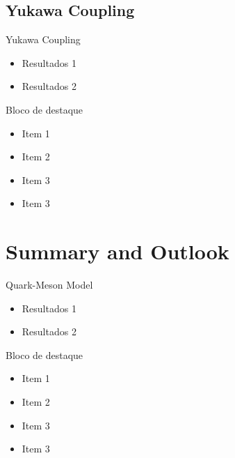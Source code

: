 \documentclass{if-beamer}
\begin{document}
\subsection{Yukawa Coupling}
\begin{frame}{Yukawa Coupling}

\begin{itemize}
    \item Resultados 1
    \item Resultados 2
\end{itemize}

\begin{block}{Bloco de destaque}
    \begin{itemize}
        \item Item 1
        \item Item 2
        \item Item 3
        \item Item 3
    \end{itemize}
\end{block}

\end{frame}

\section{Summary and Outlook}

\begin{frame}{Quark-Meson Model}

\begin{itemize}
    \item Resultados 1
    \item Resultados 2
\end{itemize}

\begin{block}{Bloco de destaque}
    \begin{itemize}
        \item Item 1
        \item Item 2
        \item Item 3
        \item Item 3
    \end{itemize}
\end{block}

\end{frame}

\end{document}
